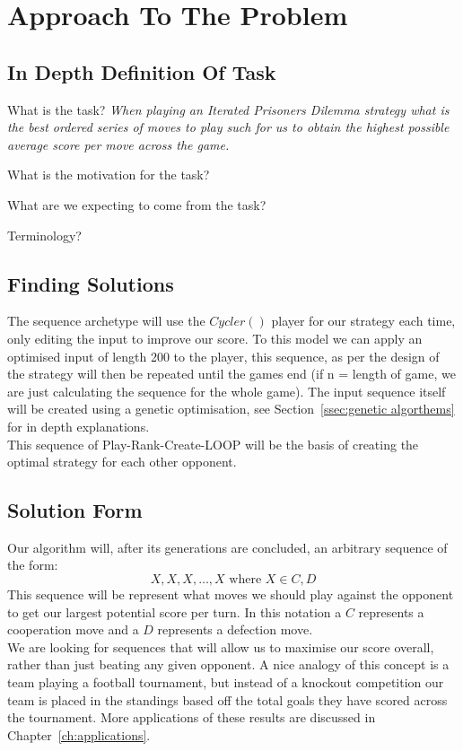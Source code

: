 
\chapter{Approach To The Problem}\label{ch:approach}
\section{In Depth Definition Of Task}
What is the task?
{\itshape When playing an Iterated Prisoners Dilemma strategy what is the best ordered series of moves to play such for us to obtain the highest possible average score per move across the game.}

What is the motivation for the task?

What are we expecting to come from the task?

Terminology?

\section{Finding Solutions}
The sequence archetype will use the \(Cycler()\) player for our strategy each time, only editing the input to improve our score.
To this model we can apply an optimised input of length 200 to the player, this sequence, as per the design of the strategy will then be repeated until the games end (if n = length of game, we are just calculating the sequence for the whole game).
The input sequence itself will be created using a genetic optimisation, see Section~\ref{ssec:genetic algorthems} for in depth explanations.\\

This sequence of Play-Rank-Create-LOOP will be the basis of creating the optimal strategy for each other opponent.

\section{Solution Form}
Our algorithm will, after its generations are concluded, an arbitrary sequence of the form:
\[X,X,X,\ldots ,X \textrm{ where }  X \in {C,D}\] 
This sequence will be represent what moves we should play against the opponent to get our largest potential score per turn. In this notation a \(C\) represents a cooperation move and a \(D\) represents a defection move. \\

We are looking for sequences that will allow us to maximise our score overall, rather than just beating any given opponent.
A nice analogy of this concept is a team playing a football tournament, but instead of a knockout competition our team is placed in the standings based off the total goals they have scored across the tournament. 
More applications of these results are discussed in Chapter~\ref{ch:applications}.

